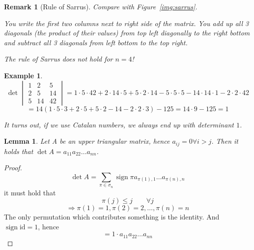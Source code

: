 \documentclass[a4paper,landscape,twocolumn]{article}
\newtheorem{ex}{Example}
\newtheorem{rem}{Remark}
\newtheorem{lemma}{Lemma}
\DeclareMathOperator\sign{sign}
\begin{document}
\begin{rem}[Rule of Sarrus]
  Compare with Figure~\ref{img:sarrus}.

  You write the first two columns next to right side of the matrix.
  You add up all 3 diagonals (the product of their values) from top left diagonally to the right bottom
  and subtract all 3 diagonals from left bottom to the top right.

  The rule of Sarrus does not hold for $n=4$!
\end{rem}

\begin{ex}
  \[
    \det\begin{vmatrix} 1 & 2 & 5 \\ 2 & 5 & 14 \\ 5 & 14 & 42 \end{vmatrix}
      = 1 \cdot 5 \cdot 42 + 2 \cdot 14 \cdot 5 + 5 \cdot 2 \cdot 14
      - 5 \cdot 5 \cdot 5 - 14 \cdot 14 \cdot 1 - 2 \cdot 2 \cdot 42
  \] \[
    = 14 (1 \cdot 5 \cdot 3 + 2 \cdot 5 + 5 \cdot 2 - 14 - 2 \cdot 2 \cdot 3) - 125
    = 14 \cdot 9 - 125 = 1
  \]

  It turns out, if we use Catalan numbers, we always end up with determinant $1$.
\end{ex}

\begin{lemma}
  Let A be an upper triangular matrix, hence $a_{ij} = 0 \forall i > j$.
  Then it holds that $\det{A} = a_{11} a_{22} \ldots a_{nn}$.
\end{lemma}
\begin{proof}
  \[ \det{A} = \sum_{\pi \in \sigma_n} \sign{\pi} a_{\pi(1),1} \ldots a_{\pi(n),n} \]
  it must hold that
  \[ \pi(j) \leq j \qquad \forall j \]
  \[ \Rightarrow \pi(1) = 1, \pi(2) = 2, \ldots, \pi(n) = n \]
  The only permutation which contributes something is the identity.
  And $\sign{\text{id}} = 1$, hence
  \[ = 1 \cdot a_{11} a_{22} \ldots a_{nn} \]
\end{proof}
\end{document}
